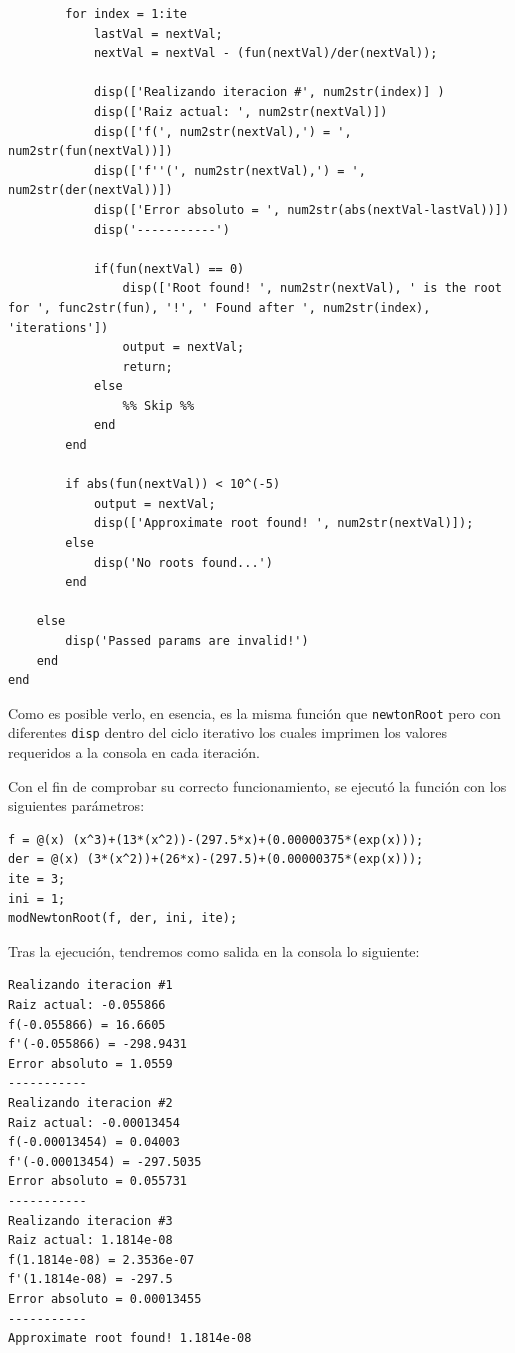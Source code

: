 \documentclass[english,notitlepage,letterpaper, 10pt]{article} %
\begin{document}
\begin{enumerate}
\begin{lstlisting}
        for index = 1:ite
            lastVal = nextVal;
            nextVal = nextVal - (fun(nextVal)/der(nextVal));

            disp(['Realizando iteracion #', num2str(index)] )
            disp(['Raiz actual: ', num2str(nextVal)])
            disp(['f(', num2str(nextVal),') = ', num2str(fun(nextVal))])
            disp(['f''(', num2str(nextVal),') = ', num2str(der(nextVal))])
            disp(['Error absoluto = ', num2str(abs(nextVal-lastVal))])
            disp('-----------')
            
            if(fun(nextVal) == 0) 
                disp(['Root found! ', num2str(nextVal), ' is the root for ', func2str(fun), '!', ' Found after ', num2str(index), 'iterations'])
                output = nextVal;
                return;
            else
                %% Skip %%
            end
        end

        if abs(fun(nextVal)) < 10^(-5)
            output = nextVal;
            disp(['Approximate root found! ', num2str(nextVal)]);
        else
            disp('No roots found...')
        end

    else
        disp('Passed params are invalid!')
    end
end 
\end{lstlisting}

    Como es posible verlo, en esencia, es la misma función que \texttt{newtonRoot} pero con diferentes \texttt{disp} dentro del ciclo iterativo los cuales imprimen los valores requeridos a la consola en cada iteración. 

    Con el fin de comprobar su correcto funcionamiento, se ejecutó la función con los siguientes parámetros:

\begin{lstlisting}
f = @(x) (x^3)+(13*(x^2))-(297.5*x)+(0.00000375*(exp(x)));
der = @(x) (3*(x^2))+(26*x)-(297.5)+(0.00000375*(exp(x)));
ite = 3;
ini = 1;
modNewtonRoot(f, der, ini, ite);
\end{lstlisting}

    Tras la ejecución, tendremos como salida en la consola lo siguiente:

\begin{lstlisting}
Realizando iteracion #1
Raiz actual: -0.055866
f(-0.055866) = 16.6605
f'(-0.055866) = -298.9431
Error absoluto = 1.0559
-----------
Realizando iteracion #2
Raiz actual: -0.00013454
f(-0.00013454) = 0.04003
f'(-0.00013454) = -297.5035
Error absoluto = 0.055731
-----------
Realizando iteracion #3
Raiz actual: 1.1814e-08
f(1.1814e-08) = 2.3536e-07
f'(1.1814e-08) = -297.5
Error absoluto = 0.00013455
-----------
Approximate root found! 1.1814e-08  
\end{lstlisting}


\end{enumerate}
\end{document}
